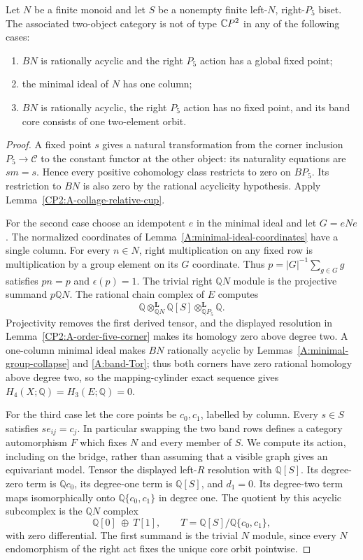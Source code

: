 \begin{lemma}
\label{CP2:A-mixed-five-reductions}
Let $N$ be a finite monoid and let
$S$ be a nonempty finite left-$N$, right-$P_5$ biset. The associated
two-object category is not of type $\mathbb{C}P^2$ in any of the following
cases:
\begin{enumerate}
\item $BN$ is rationally acyclic and the right $P_5$ action has a global fixed point;
\item the minimal ideal of $N$ has one column;
\item $BN$ is rationally acyclic, the right $P_5$ action has no fixed point,
and its band core consists of one two-element orbit.
\end{enumerate}
\end{lemma}
\begin{proof}
A fixed point $s$ gives a natural transformation from the corner
inclusion $P_5\to\mathcal C$ to the constant functor at the other
object: its naturality equations are $sm=s$. Hence every positive
cohomology class restricts to zero on $BP_5$. Its restriction to
$BN$ is also zero by the rational acyclicity hypothesis. Apply
Lemma~\ref{CP2:A-collage-relative-cup}.

For the second case choose an idempotent $e$ in the minimal ideal
and let $G=eNe$. The normalized coordinates of
Lemma~\ref{A:minimal-ideal-coordinates} have a single column.
For every $n\in N$, right multiplication on any fixed row is
multiplication by a group element on its $G$ coordinate. Thus
$p=|G|^{-1}\sum_{g\in G}g$ satisfies $pn=p$ and
$\epsilon(p)=1$. The trivial right $\mathbb QN$ module is the
projective summand $p\mathbb QN$.
The rational chain complex of $E$ computes
\[
\mathbb Q\mathbin{\otimes^{\mathbf L}_{\mathbb QN}}
\mathbb Q[S]\mathbin{\otimes^{\mathbf L}_{\mathbb QP_5}}
\mathbb Q.
\]
Projectivity removes the first derived tensor, and the displayed
resolution in Lemma~\ref{CP2:A-order-five-corner} makes its
homology zero above degree two. A one-column minimal ideal makes $BN$
rationally acyclic by Lemmas~\ref{A:minimal-group-collapse} and
\ref{A:band-Tor}; thus both corners have zero rational
homology above degree two, so the mapping-cylinder exact sequence
gives $H_4(X;\mathbb Q)=H_3(E;\mathbb Q)=0$.

For the third case let the core points be $c_0,c_1$, labelled by
column. Every $s\in S$ satisfies $se_{ij}=c_j$. In particular
swapping the two band rows defines a category automorphism $F$
which fixes $N$ and every member of $S$. We compute its action,
including on the bridge, rather than assuming that a visible
graph gives an equivariant model.
Tensor the displayed left-$R$ resolution with $\mathbb Q[S]$.
Its degree-zero term is $\mathbb Qc_0$, its degree-one term is
$\mathbb Q[S]$, and $d_1=0$. Its degree-two term maps
isomorphically onto $\mathbb Q\{c_0,c_1\}$ in degree one.
The quotient by this acyclic subcomplex is the $\mathbb QN$
complex
\[
\mathbb Q[0]\ \oplus\ T[1],\qquad
T=\mathbb Q[S]/\mathbb Q\{c_0,c_1\},
\]
with zero differential. The first summand is the trivial
$N$ module, since every $N$ endomorphism of the right act fixes
the unique core orbit pointwise.


\end{proof}
